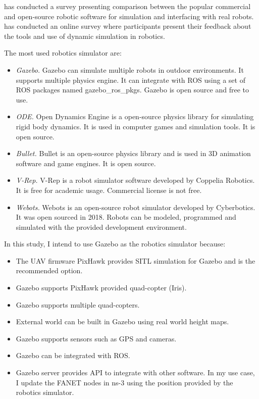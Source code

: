  has conducted a survey presenting comparison between the popular commercial and open-source robotic software for simulation and interfacing with real robots.   has conducted an online survey where participants present their feedback about the tools and use of dynamic simulation in robotics.

The most used robotics simulator are:
\begin{itemize}
	\item \textit{Gazebo.} Gazebo can simulate multiple robots in outdoor environments. It supports multiple physics engine. It can integrate with ROS using a set of ROS packages named gazebo\_ros\_pkgs. Gazebo is open source and free to use.
	\item \textit{ODE.} Open Dynamics Engine is a open-source physics library for simulating rigid body dynamics. It is used in computer games and simulation tools. It is open source.
	\item \textit{Bullet.} Bullet is an open-source physics library and is used in 3D animation software and game engines. It is open source.
	\item \textit{V-Rep.} V-Rep is a robot simulator software developed by Coppelia Robotics. It is free for academic usage. Commercial license is not free. 
	\item \textit{Webots.} Webots is an open-source robot simulator developed by Cyberbotics. It was open sourced in 2018. Robots can be modeled, programmed and simulated with the provided development environment.
\end{itemize}  

In this study, I intend to use Gazebo as the robotics simulator because:

\begin{itemize}
	\item The UAV firmware PixHawk provides SITL simulation for Gazebo and is the recommended option. 
	\item Gazebo supports PixHawk provided quad-copter (Iris).
	\item Gazebo supports multiple quad-copters.
	\item External world can be built in Gazebo using real world height maps.
	\item Gazebo supports sensors such as GPS and cameras.
	\item Gazebo can be integrated with ROS.
	\item Gazebo server provides API to integrate with other software. In my use case, I update the FANET nodes in ns-3 using the position provided by the robotics simulator. 
\end{itemize}

